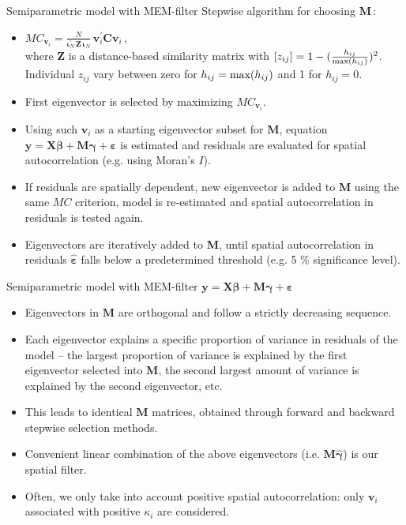 \documentclass{beamer}
\begin{document}
\begin{frame}{Semiparametric model with MEM-filter}
Stepwise algorithm for choosing $\bm{M}\,$:
\medskip
\begin{itemize}
    \item $\textit{MC}_{\bm{v}_i} = \frac{N}{\bm{\iota}_N^{\prime} \, \bm{Z} \, \bm{\iota}_N } \, \bm{v}_i^{\prime} \bm{C} \bm{v}_i \, ,$\\ \smallskip
    where $\bm{Z}$ is a distance-based similarity matrix with $[z_{ij}] = 1 - (\tfrac{h_{ij}}{\textnormal{max}(h_{ij})})^2$. Individual $z_{ij}$ vary between zero for $h_{ij} = \textnormal{max}(h_{ij})$ and 1 for $h_{ij} = 0$.
    \smallskip
    \item First eigenvector is selected by maximizing $\textit{MC}_{\bm{v}_i}$. 
    \smallskip 
    \item Using such $\bm{v}_i$ as a starting eigenvector subset for $\bm{M}$, equation $\bm{y} = \bm{X \beta } + \bm{M \gamma} + \bm{\varepsilon}$ is estimated and residuals are evaluated for spatial autocorrelation (e.g. using Moran's $I$). 
    \smallskip
    \item If residuals are spatially dependent, new eigenvector is added to $\bm{M}$ using the same $\textit{MC}$ criterion, model is re-estimated and spatial autocorrelation in residuals is tested again. \smallskip 
    \item Eigenvectors are iteratively added to $\bm{M}$, until spatial autocorrelation in residuals $\bm{\hat{\varepsilon}}$ falls below a predetermined threshold (e.g. 5 \% significance level).
\end{itemize}
\end{frame}
\begin{frame}{Semiparametric model with MEM-filter}
$\bm{y} = \bm{X \beta } + \bm{M \gamma} + \bm{\varepsilon}$
\medskip
\begin{itemize}
    \item Eigenvectors in $\bm{M}$ are orthogonal and follow a strictly decreasing sequence.
    \smallskip
    \item Each eigenvector explains a specific proportion of variance in residuals of the model -- the largest proportion of variance is explained by the first eigenvector selected into $\bm{M}$, the second largest amount of variance is explained by the second eigenvector, etc. 
    \smallskip
    \item This leads to identical $\bm{M}$ matrices, obtained through forward and backward stepwise selection methods. 
    \smallskip
    \item Convenient linear combination of the above eigenvectors (i.e. $\bm{M\hat{\gamma}}$) is our spatial filter. 
    \smallskip
    \item Often, we only take into account positive spatial autocorrelation: only $\bm{v}_i$ associated with positive $\kappa_i$ are considered.
\end{itemize}
\end{frame}
\end{document}
